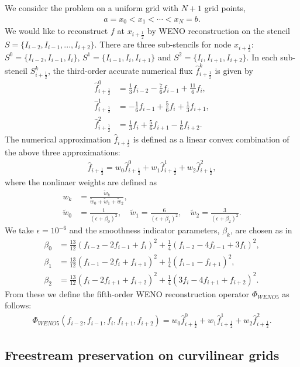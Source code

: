 We consider the problem on a uniform grid with $N+1$ grid points, \[ \begin{align*} a = x_{0} < x_{1} < \cdots < x_{N} = b. \end{align*} \] We would like to reconstruct $f$ at $x_{i+\frac{1}{2}}$ by W\+E\+NO reconstruction on the stencil $S = \{I_{i-2},I_{i-1},...,I_{i+2}\}$. There are three sub-\/stencils for node $x_{i+\frac{1}{2}}$: $S^{0} = \{I_{i-2},I_{i-1},I_{i}\}$, $S^{1} = \{I_{i-1},I_{i},I_{i+1}\}$ and $S^{2} = \{I_{i},I_{i+1},I_{i+2}\}$. In each sub-\/stencil $S_{i+\frac{1}{2}}^{k}$, the third-\/order accurate numerical flux $\hat{f}_{i+\frac{1}{2}}^{k}$ is given by \[ \begin{align*} \hat{f}_{i+\frac{1}{2}}^{0} &= \frac{1}{3}f_{i-2} - \frac{7}{6}f_{i-1} + \frac{11}{6}f_{i}, \\ \hat{f}_{i+\frac{1}{2}}^{1} &= -\frac{1}{6}f_{i-1} + \frac{5}{6}f_{i} + \frac{1}{3}f_{i+1}, \\ \hat{f}_{i+\frac{1}{2}}^{2} &= \frac{1}{3}f_{i} + \frac{5}{6}f_{i+1} - \frac{1}{6}f_{i+2}. \end{align*} \] The numerical approximation $\hat{f}_{i+\frac{1}{2}}$ is defined as a linear convex combination of the above three approximations\+: \[ \begin{align*} \hat{f}_{i+\frac{1}{2}} = w_{0}\hat{f}_{i+\frac{1}{2}}^{0} + w_{1}\hat{f}_{i+\frac{1}{2}}^{1} + w_{2}\hat{f}_{i+\frac{1}{2}}^{2}, \end{align*} \] where the nonlinaer weights are defined as \[ \begin{align*} w_{k} &= \frac{\tilde{w}_{k}}{\tilde{w}_{0}+\tilde{w}_{1}+\tilde{w}_{2}}, \\ \tilde{w}_{0} &= \frac{1}{(\epsilon+\beta_{0})^2},\quad \tilde{w}_{1} = \frac{6}{(\epsilon+\beta_{1})^2}, \quad \tilde{w}_{2} = \frac{3}{(\epsilon+\beta_{2})^2}. \end{align*} \] We take $\epsilon = 10^{-6}$ and the smoothness indicator parameters, $\beta_{k}$, are chosen as in \cite{Jiang1996:fifth} \[ \begin{align*} \beta_{0} &= \frac{13}{12}(f_{i-2}-2f_{i-1}+f_{i})^{2} + \frac{1}{4}(f_{i-2}-4f_{i-1}+3f_{i})^{2}, \\ \beta_{1} &= \frac{13}{12}(f_{i-1}-2f_{i}+f_{i+1})^{2} + \frac{1}{4}(f_{i-1}-f_{i+1})^{2}, \\ \beta_{2} &= \frac{13}{12}(f_{i}-2f_{i+1}+f_{i+2})^{2} + \frac{1}{4}(3f_{i}-4f_{i+1}+f_{i+2})^{2}. \end{align*} \] From these we define the fifth-\/order W\+E\+NO reconstruction operator $\Phi_{WENO5}$ as follows\+: \[ \begin{align*} \Phi_{WENO5}(f_{i-2},f_{i-1},f_{i},f_{i+1},f_{i+2}) = w_{0}\hat{f}_{i+\frac{1}{2}}^{0} + w_{1}\hat{f}_{i+\frac{1}{2}}^{1} + w_{2}\hat{f}_{i+\frac{1}{2}}^{2}. \end{align*} \]\hypertarget{weno_freestream}{}\subsection{Freestream preservation on curvilinear grids}\label{weno_freestream}
